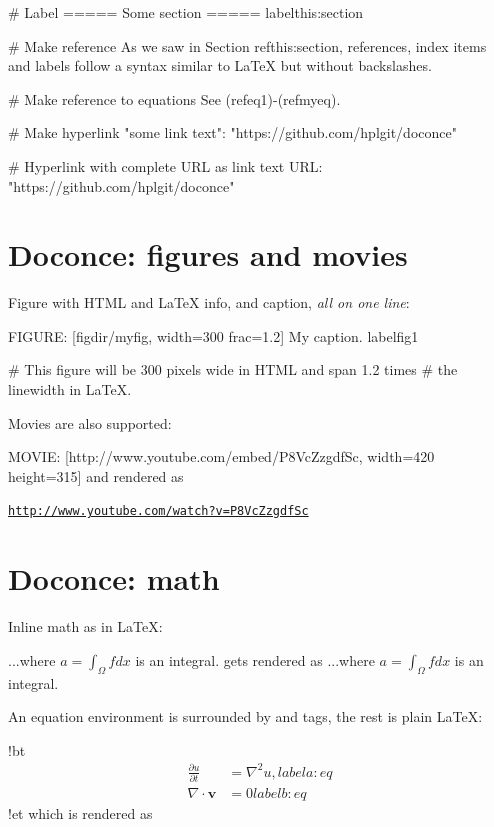 \documentclass[%
oneside,                 %
final,                   %
chapterprefix=true,      %
open=right               %
10pt]{book}
\newenvironment{graybox1admon}[1][]{
\begin{graybox1mdframed}[frametitle=#1]
}
{
\end{graybox1mdframed}
}
\begin{document}
# Label
===== Some section =====
label{this:section}

# Make reference
As we saw in Section ref{this:section}, references, index
items and labels follow a syntax similar to LaTeX
but without backslashes.

# Make reference to equations
See (ref{eq1})-(ref{myeq}).

# Make hyperlink
"some link text": "https://github.com/hplgit/doconce"

# Hyperlink with complete URL as link text
URL: "https://github.com/hplgit/doconce"
\eccq

\section{Doconce: figures and movies}


\begin{graybox1admon}[Notice.]
Figure with HTML and {\LaTeX} info, and caption, \emph{all on one line}:
\end{graybox1admon}

\bccq
FIGURE: [figdir/myfig, width=300 frac=1.2] My caption. label{fig1}

# This figure will be 300 pixels wide in HTML and span 1.2 times
# the linewidth in LaTeX.
\eccq

Movies are also supported:

\bccq
MOVIE: [http://www.youtube.com/embed/P8VcZzgdfSc, width=420 height=315]
\eccq
and rendered as

 \href{{http://www.youtube.com/watch?v=P8VcZzgdfSc}}{\nolinkurl{http://www.youtube.com/watch?v=P8VcZzgdfSc}}

\section{Doconce: math}

Inline math as in {\LaTeX}:

\bccq
...where $a=\int_{\Omega}fdx$ is an integral.
\eccq
gets rendered as ...where $a=\int_{\Omega}fdx$ is an integral.


An equation environment is surrounded by  and  tags,
the rest is plain {\LaTeX}:

\bccq
!bt
\begin{align}
\frac{\partial u}{\partial t} &= \nabla^2 u,
label{a:eq}\\
\nabla\cdot\pmb{v} & = 0
label{b:eq}
\end{align}
!et
\eccq
which is rendered as
\end{document}

